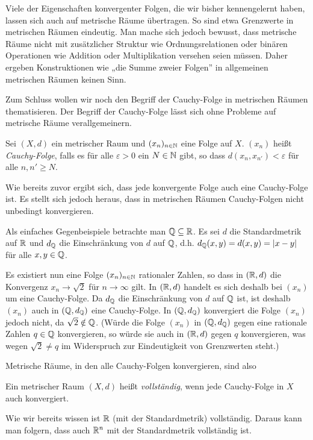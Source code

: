\documentclass[a4paper,10pt]{article}
\begin{document}
Viele der Eigenschaften konvergenter Folgen, die wir bisher kennengelernt haben, lassen sich auch auf metrische Räume übertragen. So sind etwa Grenzwerte in metrischen Räumen eindeutig. Man mache sich jedoch bewusst, dass metrische Räume nicht mit zusätzlicher Struktur wie Ordnungsrelationen oder binären Operationen wie Addition oder Multiplikation versehen seien müssen. Daher ergeben  Konstruktionen wie „die Summe zweier Folgen” in allgemeinen metrischen Räumen keinen Sinn.


Zum Schluss wollen wir noch den Begriff der Cauchy-Folge in metrischen Räumen thematisieren. Der Begriff der Cauchy-Folge lässt sich ohne Probleme auf metrische Räume verallgemeinern.

\begin{defi}
 Sei $(X,d)$ ein metrischer Raum und $(x_n)_{n \in \mathbb{N}}$ eine Folge auf $X$. $(x_n)$ heißt \emph{Cauchy-Folge}, falls es für alle $\varepsilon > 0$ ein $N \in \mathbb{N}$ gibt, so dass $d(x_n, x_{n'}) < \varepsilon$ für alle $n, n' \geq N$.
\end{defi}

Wie bereits zuvor ergibt sich, dass jede konvergente Folge auch eine Cauchy-Folge ist. Es stellt sich jedoch heraus, dass in metrischen Räumen Cauchy-Folgen nicht unbedingt konvergieren.

Als einfaches Gegenbeispiele betrachte man $\mathbb{Q} \subseteq \mathbb{R}$. Es sei $d$ die Standardmetrik auf $\mathbb{R}$ und $d_{\mathbb{Q}}$ die Einschränkung von $d$ auf $\mathbb{Q}$, d.h. $d_{\mathbb{Q}}(x,y) = d(x,y) = |x-y|$ für alle $x,y \in \mathbb{Q}$.

Es existiert nun eine Folge $(x_n)_{n \in \mathbb{N}}$ rationaler Zahlen, so dass in $(\mathbb{R}, d)$ die Konvergenz $x_n \to \sqrt{2}$ für $n \to \infty$ gilt. In $(\mathbb{R}, d)$ handelt es sich deshalb bei $(x_n)$ um eine Cauchy-Folge. Da $d_{\mathbb{Q}}$ die Einschränkung von $d$ auf $\mathbb{Q}$ ist, ist deshalb $(x_n)$ auch in $(\mathbb{Q},d_{\mathbb{Q}})$ eine Cauchy-Folge. In $(\mathbb{Q},d_{\mathbb{Q}})$ konvergiert die Folge $(x_n)$ jedoch nicht, da $\sqrt{2} \notin \mathbb{Q}$. (Würde die Folge $(x_n)$ in $(\mathbb{Q}, d_{\mathbb{Q}})$ gegen eine rationale Zahlen $q \in \mathbb{Q}$ konvergieren, so würde sie auch in $(\mathbb{R}, d)$ gegen $q$ konvergieren, was wegen $\sqrt{2} \neq q$ im Widerspruch zur Eindeutigkeit von Grenzwerten steht.)


Metrische Räume, in den alle Cauchy-Folgen konvergieren, sind also 


\begin{defi}
 Ein metrischer Raum $(X,d)$ heißt \emph{vollständig}, wenn jede Cauchy-Folge in $X$ auch konvergiert.
\end{defi}

\begin{bsp}
 Wie wir bereits wissen ist $\mathbb{R}$ (mit der Standardmetrik) vollständig. Daraus kann man folgern, dass auch $\mathbb{R}^n$ mit der Standardmetrik vollständig ist.
\end{bsp}
\end{document}
